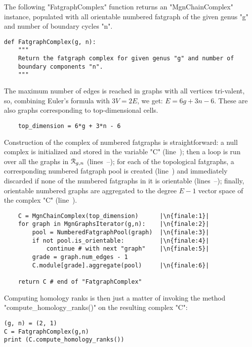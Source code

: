 The following "FatgraphComplex" function returns an "MgnChainComplex"
instance, populated with all orientable numbered fatgraph of the given
genus "g" and number of boundary cycles "n".  
\begin{lstlisting}
def FatgraphComplex(g, n):
    """
    Return the fatgraph complex for given genus "g" and number of
    boundary components "n".
    """
\end{lstlisting}
The maximum number of edges is reached in graphs with all vertices
tri-valent, so, combining Euler's formula with $3V = 2E$, we
get: $E = 6g + 3n - 6$.  These are also graphs corresponding
to top-dimensional cells.
\begin{lstlisting}
    top_dimension = 6*g + 3*n - 6

\end{lstlisting}
Construction of the complex of numbered fatgraphs is
straightforward: a null complex is initialized and stored in the
variable "C" (line~); then a loop is run over all the
graphs in $\mathcal{R}_{g,n}$ (lines~--); for each of
the topological fatgraphs, a corresponding numbered fatgraph pool is
created (line~) and immediately discarded if none of the
numbered fatgraphs in it is orientable
(lines~--); finally, orientable numbered
graphs are aggregated to the degree $E-1$ vector space of the complex
"C" (line~).
\begin{lstlisting}
    C = MgnChainComplex(top_dimension)      |\n{finale:1}|
    for graph in MgnGraphsIterator(g,n):    |\n{finale:2}|
        pool = NumberedFatgraphPool(graph)  |\n{finale:3}|
        if not pool.is_orientable:          |\n{finale:4}|
            continue # with next "graph"    |\n{finale:5}|
        grade = graph.num_edges - 1
        C.module[grade].aggregate(pool)     |\n{finale:6}|
        
    return C # end of "FatgraphComplex"
\end{lstlisting}

Computing homology ranks is then just a matter of invoking the method
"compute_homology_ranks()" on the resulting complex "C":
\begin{lstlisting}
(g, n) = (2, 1)
C = FatgraphComplex(g,n)
print (C.compute_homology_ranks())
\end{lstlisting}


